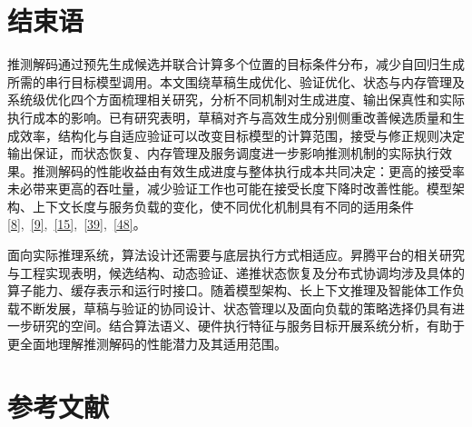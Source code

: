 \documentclass[11pt,a4paper,UTF8,fontset=none,scheme=plain,zihao=-4]{ctexart}
\begin{document}
\hypertarget{section-9}{%
\section{结束语}\label{section-9}}

推测解码通过预先生成候选并联合计算多个位置的目标条件分布，减少自回归生成所需的串行目标模型调用。本文围绕草稿生成优化、验证优化、状态与内存管理及系统级优化四个方面梳理相关研究，分析不同机制对生成进度、输出保真性和实际执行成本的影响。已有研究表明，草稿对齐与高效生成分别侧重改善候选质量和生成效率，结构化与自适应验证可以改变目标模型的计算范围，接受与修正规则决定输出保证，而状态恢复、内存管理及服务调度进一步影响推测机制的实际执行效果。推测解码的性能收益由有效生成进度与整体执行成本共同决定：更高的接受率未必带来更高的吞吐量，减少验证工作也可能在接受长度下降时改善性能。模型架构、上下文长度与服务负载的变化，使不同优化机制具有不同的适用条件\protect\hyperlink{ref-evict}{{[}8{]}},~\protect\hyperlink{ref-hybridspec}{{[}9{]}},~\protect\hyperlink{ref-replayssm}{{[}15{]}},~\protect\hyperlink{ref-blockverification}{{[}39{]}},~\protect\hyperlink{ref-forespark}{{[}48{]}}。

面向实际推理系统，算法设计还需要与底层执行方式相适应。昇腾平台的相关研究与工程实现表明，候选结构、动态验证、递推状态恢复及分布式协调均涉及具体的算子能力、缓存表示和运行时接口。随着模型架构、长上下文推理及智能体工作负载不断发展，草稿与验证的协同设计、状态管理以及面向负载的策略选择仍具有进一步研究的空间。结合算法语义、硬件执行特征与服务目标开展系统分析，有助于更全面地理解推测解码的性能潜力及其适用范围。

\hypertarget{references}{%
\section*{参考文献}\label{references}}
\end{document}
